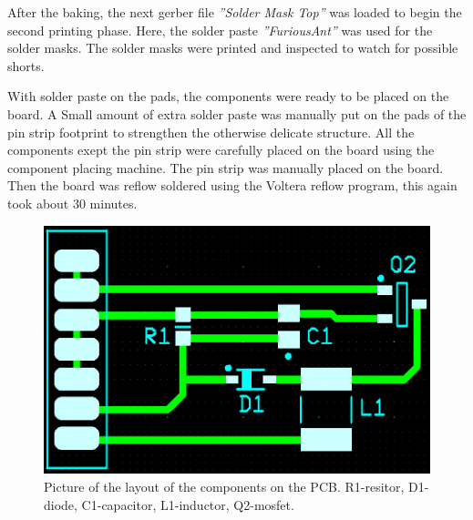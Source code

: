 After the baking, the next gerber file \textit{''Solder Mask Top''} was loaded to begin the second printing phase. Here, the solder paste \textit{''FuriousAnt''} was used for the solder masks. The solder masks were printed and inspected to watch for possible shorts.

With solder paste on the pads, the components were ready to be placed on the board. A Small amount of extra solder paste was manually put on the pads of the pin strip footprint to strengthen the otherwise delicate structure. All the components exept the pin strip were carefully placed on the board using the component placing machine. The pin strip was manually placed on the board. Then the board was reflow soldered using the Voltera reflow program, this again took about 30 minutes.
\begin{figure}[h]
    \includegraphics[width=\linewidth]{PCBlayout.jpg}
    \caption{Picture of the layout of the components on the PCB\@. R1\hyp{}resitor, D1\hyp{}diode, C1\hyp{}capacitor, L1\hyp{}inductor, Q2\hyp{}mosfet.}
    \label{fig:PCB}
\end{figure}
